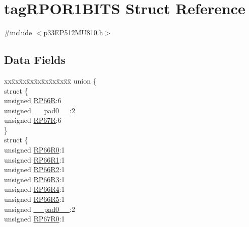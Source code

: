 \hypertarget{structtag_r_p_o_r1_b_i_t_s}{}\section{tag\+R\+P\+O\+R1\+B\+I\+TS Struct Reference}
\label{structtag_r_p_o_r1_b_i_t_s}


{\ttfamily \#include $<$p33\+E\+P512\+M\+U810.\+h$>$}

\subsection*{Data Fields}
\begin{DoxyCompactItemize}
\item 
\begin{tabbing}
xx\=xx\=xx\=xx\=xx\=xx\=xx\=xx\=xx\=\kill
union \{\\
\>struct \{\\
\>\>unsigned \hyperlink{structtag_r_p_o_r1_b_i_t_s_a98c4ae3545b4070adf35bcedb971bfc9}{RP66R}:6\\
\>\>unsigned \hyperlink{structtag_r_p_o_r1_b_i_t_s_adf71f3d8410c1f1dbbc96680a92c49af}{\_\_pad0\_\_}:2\\
\>\>unsigned \hyperlink{structtag_r_p_o_r1_b_i_t_s_a82de6ff832f963b702f5826b726842f7}{RP67R}:6\\
\>\} \\
\>struct \{\\
\>\>unsigned \hyperlink{structtag_r_p_o_r1_b_i_t_s_a9689bae562f631dbe8ecca26bc0c9bd2}{RP66R0}:1\\
\>\>unsigned \hyperlink{structtag_r_p_o_r1_b_i_t_s_acabc01b2a8c0d23116d8d55034c62d46}{RP66R1}:1\\
\>\>unsigned \hyperlink{structtag_r_p_o_r1_b_i_t_s_ad2dc1d1d2c63661d74d1eb8d54c2c04f}{RP66R2}:1\\
\>\>unsigned \hyperlink{structtag_r_p_o_r1_b_i_t_s_ac5bbae68925957fa0d9746157717dee3}{RP66R3}:1\\
\>\>unsigned \hyperlink{structtag_r_p_o_r1_b_i_t_s_a5cdb0cb9ae34a58f98323f5910dc724c}{RP66R4}:1\\
\>\>unsigned \hyperlink{structtag_r_p_o_r1_b_i_t_s_add7c1b6f1c6b6c3b9baa0190b577f001}{RP66R5}:1\\
\>\>unsigned \hyperlink{structtag_r_p_o_r1_b_i_t_s_adf71f3d8410c1f1dbbc96680a92c49af}{\_\_pad0\_\_}:2\\
\>\>unsigned \hyperlink{structtag_r_p_o_r1_b_i_t_s_aa58e87fb90cada890925dc0e3a9943d4}{RP67R0}:1\\

\end{tabbing}
\end{DoxyCompactItemize}
